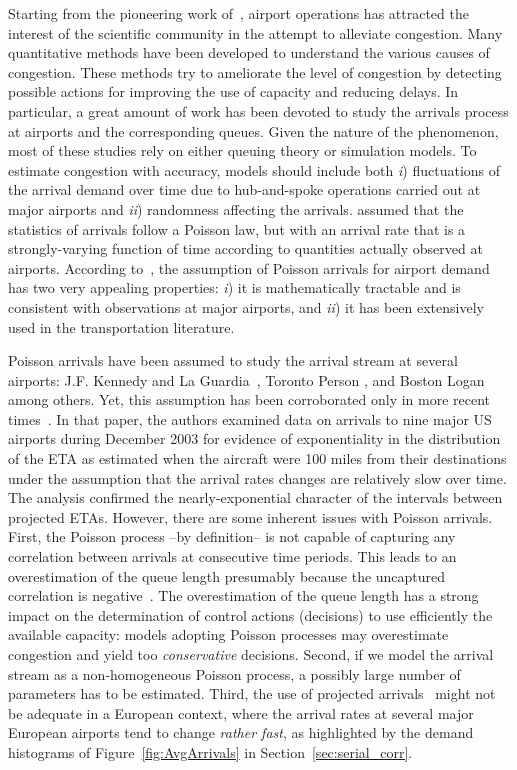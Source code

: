 \documentclass[]{elsarticle}
\begin{document}
Starting from the pioneering work of~\citet{Blum1959}, airport operations has attracted the interest of the scientific community in the attempt to alleviate congestion.
Many quantitative methods have been developed to understand the various causes of congestion.
These methods try to ameliorate the level of congestion by detecting possible actions for improving the use of capacity and reducing delays.
In particular, a great amount of work has been devoted to study the arrivals process at airports and the corresponding queues.
Given the nature of the phenomenon, most of these studies rely on either queuing theory or simulation models. To  estimate congestion with accuracy, models should include both \emph{i}) fluctuations of the arrival demand over time due to hub-and-spoke operations carried out at major airports and \emph{ii}) randomness affecting the arrivals. \citeauthor{Koop1972} assumed that the statistics of arrivals follow a Poisson law, but with an arrival rate that is a strongly-varying function of time according to quantities actually observed at airports.
According to~\citet{HO1975}, the assumption of Poisson arrivals for airport demand has two very appealing properties:
\emph{i}) it is mathematically tractable and is consistent with observations at major airports, and
\emph{ii}) it has been extensively used in the transportation literature.

Poisson arrivals have been assumed to study the arrival stream at several airports:  J.F. Kennedy and La Guardia~\citep{Koop1972}, Toronto Person \citep{Bookbinder1986}, and Boston Logan~\citep{HO1975} among others. Yet, this assumption has been corroborated only in more recent times~\citep{willemain2004statistical}.
In that paper, the authors examined data on arrivals to nine major US airports during December 2003 for evidence of exponentiality in the distribution of the \ac{ETA} as estimated when the aircraft were 100 miles from their destinations under the assumption that the arrival rates changes are relatively slow over time. The analysis confirmed the nearly-exponential character of the intervals between projected \acp{ETA}.
However, there are some inherent issues with Poisson arrivals.
First, the Poisson process --by definition-- is not capable of capturing any correlation between arrivals at consecutive time periods.
This leads to an overestimation of the queue length presumably because the uncaptured correlation is negative~\citep{caccavale2014model}.
The overestimation of the queue length has a strong impact on the determination of control actions (decisions) to use efficiently the available capacity: models adopting Poisson processes may overestimate congestion and yield too \emph{conservative} decisions.
Second, if we model the arrival stream as a non-homogeneous Poisson process, a possibly large number of parameters has to be estimated. %
Third, the use of projected arrivals~\citep{willemain2004statistical} might not be adequate in a European context, where the arrival rates at several major European airports tend to change \emph{rather fast}, as highlighted by the demand histograms of Figure~\ref{fig:AvgArrivals} in Section~\ref{sec:serial_corr}.
\end{document}
